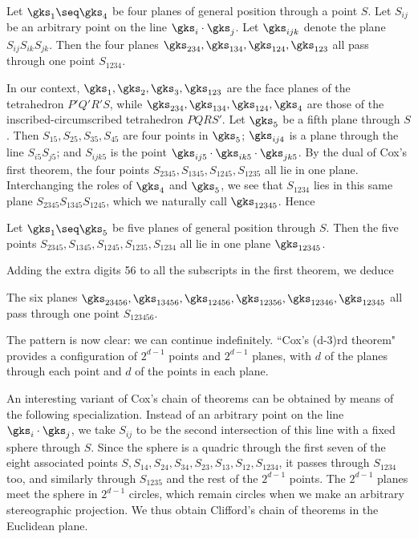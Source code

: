  Let $\gks_1\seq\gks_4$ be four planes of general position through a point $S$.  Let $S_{ij}$ be an arbitrary point on the line $\gks_i\cdot\gks_j$.  Let $\gks_{ijk}$ denote the plane $S_{ij}S_{ik}S_{jk}$.  Then the four planes $\gks_{234},\gks_{134},\gks_{124},\gks_{123}$ all pass through one point $S_{1234}$. \endproclaim

In our context, $\gks_1,\gks_2,\gks_3,\gks_{123}$ are the face planes of the tetrahedron $P'Q'R'S$, while $\gks_{234},\gks_{134},\gks_{124},\gks_4$ are those of the inscribed-circumscribed tetrahedron $PQRS'$.  Let $\gks_5$ be a fifth plane through $S$.  Then $S_{15},S_{25},S_{35},S_{45}$ are four points in $\gks_5$; $\gks_{ij4}$ is a plane through the line $S_{i5}S_{j5}$; and $S_{ijk5}$ is the point $\gks_{ij5}\cdot\gks_{ik5}\cdot\gks_{jk5}$.  By the dual of Cox's first theorem, the four points $S_{2345},S_{1345},S_{1245},S_{1235}$ all lie in one plane.  Interchanging the roles of $\gks_4$ and $\gks_5$, we see that $S_{1234}$ lies in this same plane $S_{2345}S_{1345}S_{1245}$, which we naturally call $\gks_{12345}$.  Hence

 Let $\gks_1\seq\gks_5$ be five planes of general position through $S$.  Then the five points $S_{2345},S_{1345},S_{1245},S_{1235},S_{1234}$ all lie in one plane $\gks_{12345}$. \endproclaim

Adding the extra digits 56 to all the subscripts in the first theorem, we deduce

 The six planes $\gks_{23456},\gks_{13456},\gks_{12456},\gks_{12356},\gks_{12346},\gks_{12345}$ all pass through one point $S_{123456}$. \endproclaim  

The pattern is now clear:  we can continue indefinitely.  ``Cox's (d-3)rd theorem" provides a configuration of $2^{d-1}$ points and $2^{d-1}$ planes, with $d$ of the planes through each point and $d$ of the points in each plane.

An interesting variant of Cox's chain of theorems can be obtained by means of the following specialization.  Instead of an arbitrary point on the line $\gks_i\cdot\gks_j$, we take $S_{ij}$ to be the second intersection of this line with a fixed sphere through $S$.  Since the sphere is a quadric through the first seven of the eight associated points $S,S_{14},S_{24},S_{34},S_{23},S_{13},S_{12},S_{1234}$, it passes through $S_{1234}$ too, and similarly through $S_{1235}$ and the rest of the $2^{d-1}$ points.  The $2^{d-1}$ planes meet the sphere in $2^{d-1}$ circles, which remain circles when we make an arbitrary stereographic projection.  We thus obtain Clifford's chain of theorems in the Euclidean plane.

